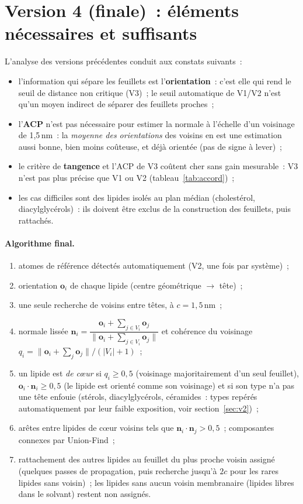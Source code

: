 \documentclass[11pt,a4paper]{article}
\begin{document}
\section{Version 4 (finale)~: éléments nécessaires et suffisants}\label{sec:v4}
L'analyse des versions précédentes conduit aux constats suivants~:
\begin{itemize}
\item l'information qui sépare les feuillets est l'\textbf{orientation}~: c'est elle qui rend le seuil de distance
non critique (V3)~; le seuil automatique de V1/V2 n'est qu'un moyen indirect de séparer des feuillets proches~;
\item l'\textbf{ACP} n'est pas nécessaire pour estimer la normale à l'échelle d'un voisinage de 1,5\,nm~: la
\emph{moyenne des orientations} des voisins en est une estimation aussi bonne, bien moins coûteuse, et déjà
orientée (pas de signe à lever)~;
\item le critère de \textbf{tangence} et l'ACP de V3 coûtent cher sans gain mesurable~: V3 n'est pas plus précise
que V1 ou V2 (tableau~\ref{tab:accord})~;
\item les cas difficiles sont des lipides isolés au plan médian (cholestérol, diacylglycérols)~: ils doivent être
exclus de la construction des feuillets, puis rattachés.
\end{itemize}

\paragraph{Algorithme final.}
\begin{enumerate}
\item atomes de référence détectés automatiquement (V2, une fois par système)~;
\item orientation $\mathbf o_i$ de chaque lipide (centre géométrique $\to$ tête)~;
\item une seule recherche de voisins entre têtes, à $c=1{,}5$\,nm~;
\item normale lissée $\mathbf n_i=\dfrac{\mathbf o_i+\sum_{j\in V_i}\mathbf o_j}{\|\mathbf o_i+\sum_{j\in V_i}\mathbf o_j\|}$
et cohérence du voisinage $q_i=\|\mathbf o_i+\sum_j\mathbf o_j\|/(|V_i|+1)$~;
\item un lipide est \emph{de cœur} si $q_i\geq0{,}5$ (voisinage majoritairement d'un seul feuillet),
$\mathbf o_i\cdot\mathbf n_i\geq0{,}5$ (le lipide est orienté comme son voisinage) et si son type n'a pas une
tête enfouie (stérols, diacylglycérols, céramides~: types repérés automatiquement par leur faible exposition, voir
section~\ref{sec:v2})~;
\item arêtes entre lipides de cœur voisins tels que $\mathbf n_i\cdot\mathbf n_j>0{,}5$~; composantes connexes par
Union-Find~;
\item rattachement des autres lipides au feuillet du plus proche voisin assigné (quelques passes de propagation,
puis recherche jusqu'à $2c$ pour les rares lipides sans voisin)~; les lipides sans aucun voisin membranaire (lipides
libres dans le solvant) restent non assignés.
\end{enumerate}
\end{document}
